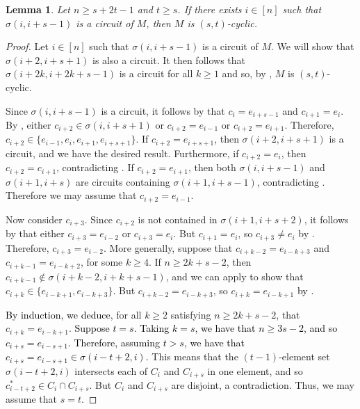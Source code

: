 \documentclass[11pt]{amsart}
\newtheorem{lemma}[theorem]{Lemma}
\newcommand{\blue}{\textcolor{black}}
\newcommand{\bloo}{\textcolor{black}}
\begin{document}
\begin{lemma}
\label{gap0}
Let $n \geq s+2t-1$ and $t \geq s$. If there exists $i \in [n]$ such that $\sigma(i, i+s-1)$ is a circuit of $M$, then $M$ is $(s, t)$-cyclic.
\end{lemma}

\begin{proof}
Let $i\in [n]$ such that $\sigma(i, i+s-1)$ is a circuit of $M$. We will show that $\sigma(i+2, i+s+1)$ is also a circuit. It then follows that $\sigma(i+2k, i+2k+s-1)$ is a circuit for all $k\geq 1$ and so, by , $M$ is $(s, t)$-cyclic.

Since $\sigma(i, i+s-1)$ is a circuit, it follows by  that $c_i = e_{i+s-1}$ and $c_{i+1} = e_i$. By , either $c_{i+2} \in \sigma(i, i+s+1)$ or $c_{i+2} = e_{i-1}$ or $c_{i+2} = e_{i+1}$. Therefore, $c_{i+2} \in \{e_{i-1} ,e_i, e_{i+1}, e_{i+s+1}\}$. If $c_{i+2} = e_{i+s+1}$, then $\sigma(i+2, i+s+1)$ is a circuit, and we have the desired result. 
Furthermore, if $c_{i+2} = e_i$, then $c_{i+2} = c_{i+1}$, contradicting . If $c_{i+2} = e_{i+1}$, then both $\sigma(i, i+s-1)$ and $\sigma(i+1, i+s)$ are circuits containing $\sigma(i+1, i+s-1)$, contradicting . Therefore we may assume that $c_{i+2} = e_{i-1}$.

Now consider $c_{i+3}$. Since $c_{i+2}$ is not contained in $\sigma(i+1,i+s+2)$, it follows by  that either $c_{i+3} = e_{i-2}$ or $c_{i+3} = e_i$. But $c_{i+1} = e_i$, so $c_{i+3} \neq e_i$ by . Therefore, $c_{i+3} = e_{i-2}$. More generally, suppose that $c_{i+k-2} = e_{i-k+3}$ and $c_{i+k-1} = e_{i-k+2}$, for some $k \geq 4$. If $n \geq 2k+s-2$, then $c_{i+k-1} \notin \sigma(i+k-2,i+k+s-1)$, and we can apply  to show that $c_{i+k} \in \{e_{i-k+1},e_{i-k+3}\}$. But $c_{i+k-2} = e_{i-k+3}$, so $c_{i+k} = e_{i-k+1}$ \blue{by }.

\blue{By induction, we deduce}, for all $k \geq 2$ satisfying $n \geq 2k+s-2$, that $c_{i+k} = e_{i-k+1}$. \bloo{Suppose $t=s$. Taking $k=s$, we have that $n \geq 3s-2$, and so $c_{i+s} = e_{i-s+1}$. Therefore, assuming $t > s$, we have that $c_{i+s} = e_{i-s+1} \in \sigma(i-t+2,i)$.} This means that the $(t-1)$-element set $\sigma(i-t+2,i)$ intersects each of $C_i$ and $C_{i+s}$ in one element, and so $c^*_{i-t+2} \in C_i \cap C_{i+s}$. But $C_i$ and $C_{i+s}$ are disjoint, a contradiction. Thus, we may assume that $s=t$.


\end{proof}
\end{document}
